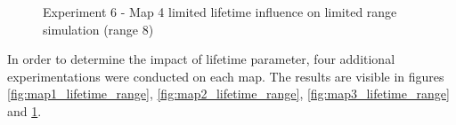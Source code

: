 \begin{figure}[H]
    \centering

    \hspace*{\fill}

    \hspace*{\fill}

    \caption{Experiment 6 - Map 4 limited lifetime influence on limited range simulation (range 8)}\label{fig:map4_lifetime_range}
\end{figure}

In order to determine the impact of lifetime parameter, four additional experimentations were conducted on each map.
The results are visible in figures \ref{fig:map1_lifetime_range}, \ref{fig:map2_lifetime_range}, \ref{fig:map3_lifetime_range} and \ref{fig:map4_lifetime_range}.

